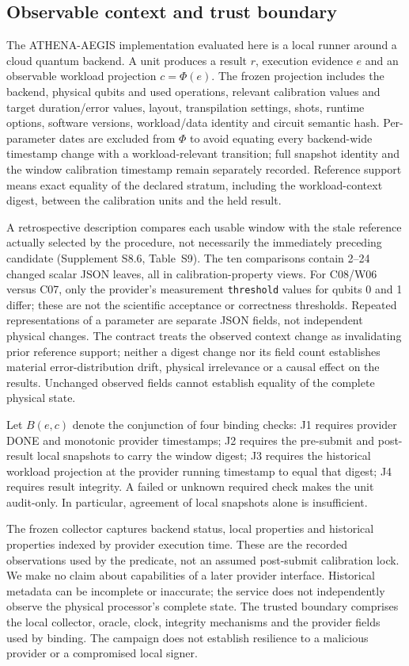 \documentclass[pdflatex,sn-mathphys-num]{sn-jnl}
\begin{document}
\subsection{Observable context and trust boundary}
The ATHENA-AEGIS implementation evaluated here is a local runner around a cloud quantum backend. A unit produces a result $r$, execution evidence $e$ and an observable workload projection $c=\Phi(e)$. The frozen projection includes the backend, physical qubits and used operations, relevant calibration values and target duration/error values, layout, transpilation settings, shots, runtime options, software versions, workload/data identity and circuit semantic hash. Per-parameter dates are excluded from $\Phi$ to avoid equating every backend-wide timestamp change with a workload-relevant transition; full snapshot identity and the window calibration timestamp remain separately recorded. Reference support means exact equality of the declared stratum, including the workload-context digest, between the calibration units and the held result.

A retrospective description compares each usable window with the stale reference actually selected by the procedure, not necessarily the immediately preceding candidate (Supplement S8.6, Table~S9). The ten comparisons contain 2--24 changed scalar JSON leaves, all in calibration-property views. For C08/W06 versus C07, only the provider's measurement \texttt{threshold} values for qubits 0 and 1 differ; these are not the scientific acceptance or correctness thresholds. Repeated representations of a parameter are separate JSON fields, not independent physical changes. The contract treats the observed context change as invalidating prior reference support; neither a digest change nor its field count establishes material error-distribution drift, physical irrelevance or a causal effect on the results. Unchanged observed fields cannot establish equality of the complete physical state.

Let $B(e,c)$ denote the conjunction of four binding checks: J1 requires provider DONE and monotonic provider timestamps; J2 requires the pre-submit and post-result local snapshots to carry the window digest; J3 requires the historical workload projection at the provider running timestamp to equal that digest; J4 requires result integrity. A failed or unknown required check makes the unit audit-only. In particular, agreement of local snapshots alone is insufficient.

The frozen collector captures backend status, local properties and historical properties indexed by provider execution time. These are the recorded observations used by the predicate, not an assumed post-submit calibration lock. We make no claim about capabilities of a later provider interface. Historical metadata can be incomplete or inaccurate; the service does not independently observe the physical processor's complete state. The trusted boundary comprises the local collector, oracle, clock, integrity mechanisms and the provider fields used by binding. The campaign does not establish resilience to a malicious provider or a compromised local signer.
\end{document}
